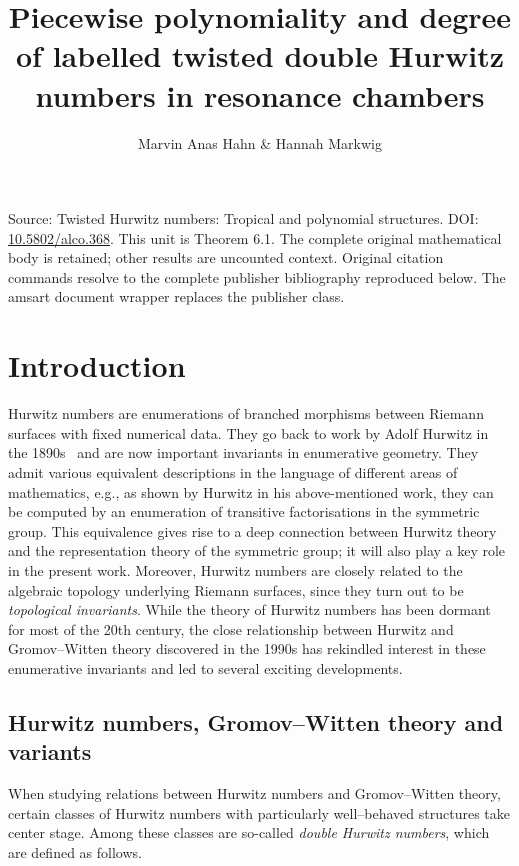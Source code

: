 \documentclass[10pt]{amsart}
\title[Human proof corpus 950]{Piecewise polynomiality and degree of labelled twisted double Hurwitz numbers in resonance chambers}
\author{Marvin Anas Hahn \& Hannah Markwig}
\theoremstyle{plain}
\theoremstyle{definition}
\theoremstyle{definition}
\theoremstyle{plain}
\theoremstyle{plain}
\theoremstyle{remark}
\theoremstyle{plain}
\theoremstyle{plain}
\begin{document}
\maketitle
\noindent Source: Twisted Hurwitz numbers: Tropical and polynomial structures. DOI: \href{https://doi.org/10.5802/alco.368}{10.5802/alco.368}. This unit is Theorem 6.1. The complete original mathematical body is retained; other results are uncounted context. Original citation commands resolve to the complete publisher bibliography reproduced below. The amsart document wrapper replaces the publisher class.


\section{Introduction}

Hurwitz numbers are enumerations of branched morphisms between Riemann surfaces with fixed numerical data. They go back to work by Adolf Hurwitz in the 1890s~\cite{hurwitz1892algebraische} and are now important invariants in enumerative geometry. 
They admit various equivalent descriptions in the language of different areas of mathematics, e.g., as shown by Hurwitz in his above-mentioned work, they can be computed by an enumeration of transitive factorisations in the symmetric group. This equivalence gives rise to a deep connection between Hurwitz theory and the representation theory of the symmetric group; it will also play a key role in the present work. Moreover, Hurwitz numbers are closely related to the algebraic topology underlying Riemann surfaces, since they turn out to be \textit{topological invariants}. While the theory of Hurwitz numbers has been dormant for most of the 20th century, the close relationship between Hurwitz and Gromov--Witten theory discovered in the 1990s has rekindled interest in these enumerative invariants and led to several exciting developments.\vspace{\baselineskip}

\subsection{Hurwitz numbers, Gromov--Witten theory and variants}
When studying relations between Hurwitz numbers and Gromov--Witten theory, certain classes of Hurwitz numbers with particularly well--behaved structures take center stage. Among these classes are so-called \textit{double Hurwitz numbers}, which are defined as follows.
\end{document}
